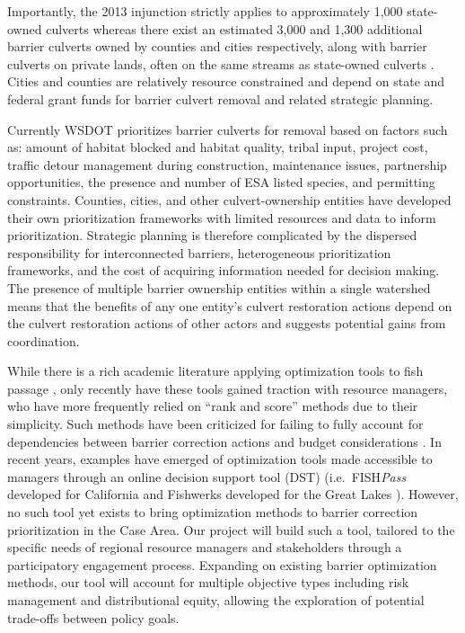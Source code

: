 \documentclass[12pt]{elsarticle}
\begin{document}
	Importantly, the 2013 injunction strictly applies to approximately 1,000 state-owned culverts whereas there exist an estimated 3,000 and 1,300 additional barrier culverts owned by counties and cities respectively, along with barrier culverts on private lands, often on the same streams as state-owned culverts \citep{brown_coming_2019}. Cities and counties are relatively resource constrained and depend on state and federal grant funds for barrier culvert removal and related strategic planning. 
	
	Currently WSDOT prioritizes barrier culverts for removal based on factors such as: amount of habitat blocked and habitat quality, tribal input, project cost, traffic detour management during construction, maintenance issues, partnership opportunities, the presence and number of ESA listed species, and permitting constraints. Counties, cities, and other culvert-ownership entities have developed their own prioritization frameworks with limited resources and data to inform prioritization. Strategic planning is therefore complicated by the dispersed responsibility for interconnected barriers, heterogeneous prioritization frameworks, and the cost of acquiring information needed for decision making. The presence of multiple barrier ownership entities within a single watershed means that the benefits of any one entity's culvert restoration actions depend on the culvert restoration actions of other actors and suggests potential gains from coordination. 
	
	While there is a rich academic literature applying optimization tools to fish passage \citep{ohanley_optimizing_2005, kuby_multiobjective_2005, mcmanamay_commonalities_2019, couto_safeguarding_2021}, only recently have these tools gained traction with resource managers, who have more frequently relied on ``rank and score'' methods due to their simplicity. Such methods have been criticized for failing to fully account for dependencies between barrier correction actions and budget considerations \cite{mckay_comparison_2020}. In recent years, examples have emerged of optimization tools made accessible to managers through an online decision support tool (DST) (i.e.\ FISH\emph{Pass} developed for California \citep{ohanley_optipass_2015} and Fishwerks developed for the Great Lakes \citep{moody_pet_2017}). However, no such tool yet exists to bring optimization methods to barrier correction prioritization in the Case Area. Our project will build such a tool, tailored to the specific needs of regional resource managers and stakeholders through a participatory engagement process. Expanding on existing barrier optimization methods, our tool will account for multiple objective types including risk management and distributional equity, allowing the exploration of potential trade-offs between policy goals. 
	
\end{document}
